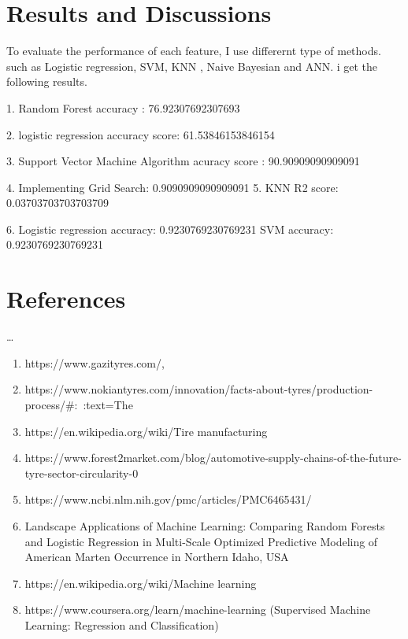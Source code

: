 \documentclass{article}
\begin{document}
 \section{Results and Discussions}

To evaluate the performance of each feature, I use differernt type of methods. such as Logistic regression, SVM, KNN , Naive Bayesian and ANN. i get the following results.

1. Random Forest accuracy : 76.92307692307693

2. logistic regression accuracy score:  61.53846153846154

3. Support Vector Machine Algorithm acuracy score : 90.90909090909091

4. Implementing Grid Search: 0.9090909090909091
5. KNN R2 score: 0.03703703703703709

6. Logistic regression accuracy: 0.9230769230769231
SVM accuracy: 0.9230769230769231









\section{References}
 \dots

\begin{enumerate}
\item https://www.gazityres.com/,
\item https://www.nokiantyres.com/innovation/facts-about-tyres/production-process/#:~:text=The%





\item https://en.wikipedia.org/wiki/Tire manufacturing

\item
https://www.forest2market.com/blog/automotive-supply-chains-of-the-future-tyre-sector-circularity-0 

\item
https://www.ncbi.nlm.nih.gov/pmc/articles/PMC6465431/

\item
Landscape Applications of Machine
Learning: Comparing Random Forests
and Logistic Regression in Multi-Scale
Optimized Predictive Modeling of American
Marten Occurrence in Northern Idaho, USA


\item
https://en.wikipedia.org/wiki/Machine learning

\item
https://www.coursera.org/learn/machine-learning (Supervised Machine Learning: Regression and Classification)

\end{enumerate}
\end{document}
